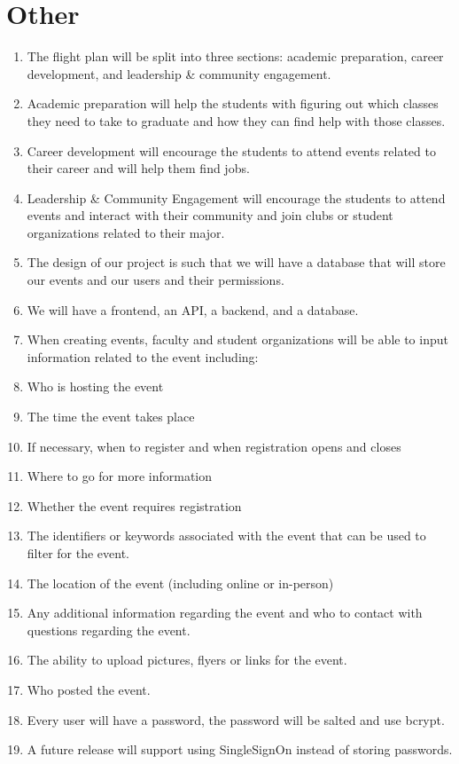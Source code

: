 \documentclass{article}
\begin{document}
\section{Other}
	\begin{enumerate}
	\item The flight plan will be split into three sections: academic preparation, career development, and leadership \& community engagement. 
	\item Academic preparation will help the students with figuring out which classes they need to take to graduate and how they can find help with those classes.
	\item Career development will encourage the students to attend events related to their career and will help them find jobs.
	\item Leadership \& Community Engagement will encourage the students to attend events and interact with their community and join clubs or student organizations related to their major.
	\item The design of our project is such that we will have a database that will store our events and our users and their permissions.
	\item We will have a frontend, an API, a backend, and a database.


	\item When creating events, faculty and student organizations will be able to input information related to the event including:
	\item Who is hosting the event
	\item The time the event takes place
	\item If necessary, when to register and when registration opens and closes
	\item Where to go for more information
	\item Whether the event requires registration
	\item The identifiers or keywords associated with the event that can be used to filter for the event.
	\item The location of the event (including online or in-person)
	\item Any additional information regarding the event and who to contact with questions regarding the event.
	\item The ability to upload pictures, flyers or links for the event.
	\item Who posted the event.
	\item Every user will have a password, the password will be salted and use bcrypt.
	\item A future release will support using SingleSignOn instead of storing passwords.
\end{enumerate}
\end{document}
